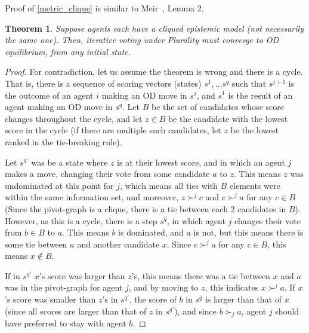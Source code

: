 \documentclass[letterpaper]{article} %
\newtheorem{theorem}{Theorem}
\begin{document}
Proof of \ref{metric_clique} is similar to Meir~, Lemma 2. 

\begin{theorem}
Suppose agents each have a cliqued epistemic model (not necessarily the same one). Then, iterative voting under Plurality must converge to OD equilibrium, from any initial state. 
\end{theorem}
\begin{proof}
For contradiction, let us assume the theorem is wrong and there is a cycle. That is, there is a sequence of scoring vectors (states) ${s}^{1},\ldots {s}^{q}$ such that ${s}^{j+1}$ is the outcome of an agent $i$ making an OD move in ${s}^{j}$, and ${s}^{1}$ is the result of an agent making an OD move in ${s}^{q}$. Let $B$ be the set of candidates whose score changes throughout the cycle, and let $z\in B$ be the candidate with the lowest score in the cycle (if there are multiple such candidates, let $z$ be the lowest ranked in the tie-breaking rule).

Let ${s}^{q'}$ was be a state where $z$ is at their lowest score, and in which an agent $j$ makes a move, changing their vote from some candidate $a$ to $z$. This means $z$ was undominated at this point for $j$, which means all ties with $B$ elements were within the same information set, and moreover, $z\succ^{j}c$ and $c\succ^{j}a$ for any $c\in B$ (Since the pivot-graph is a clique, there is a tie between each 2 candidates in $B$). However, as this is a cycle, there is a step ${s}^{\bar{q}}$, in which agent $j$ changes their vote from $b\in B$ to $a$. This means $b$ is dominated, and $a$ is not, but this means there is some tie between $a$ and another candidate $x$. Since $c\succ^{j} a$ for any $c\in B$, this means $x\notin B$.

If in ${s}^{q'}$ $x$'s score was larger than $z$'s, this means there was a tie between $x$ and $a$ was in the pivot-graph for agent $j$, and by moving to $z$, this indicates $x\succ^{j} a$. If $x$'s score was smaller than $z$'s in ${s}^{q'}$, the score of $b$ in ${s}^{\bar{q}}$ is larger than that of $x$ (since all scores are larger than that of $z$ in ${s}^{q'}$), and since $b\succ_{j}a$, agent $j$ should have preferred to stay with agent $b$. 
\end{proof}
\end{document}
